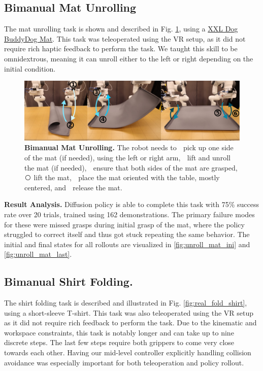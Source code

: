 \subsection{Bimanual Mat Unrolling}

The mat unrolling task is shown and described in Fig. \ref{fig:real_unroll_mat}, using a
\href{https://www.amazon.com/DogBuddy-Dog-Food-Mat-Waterproof/dp/B08GGDNB71}{XXL Dog Buddy\legalTM Dog Mat}.
This task was teleoperated using the VR setup, as it did not require rich haptic feedback to perform the task. We taught this skill to be omnidextrous, meaning it can unroll either to the left or right depending on the initial condition.

\begin{figure}[t]
\centering
\includegraphics[width=\linewidth]{figure/real_unroll_mat_setup_compressed.pdf}
\caption{\textbf{Bimanual Mat Unrolling. }
\label{fig:real_unroll_mat}
The robot needs to
\textcircled{} pick up one side of the mat (if needed), using the left or right arm,
\textcircled{} lift and unroll the mat (if needed),
\textcircled{} ensure that both sides of the mat are grasped,
\textcircled{} lift the mat,
\textcircled{} place the mat oriented with the table, mostly centered, and
\textcircled{} release the mat.
}
\vspace{-4mm}
\end{figure}

\textbf{Result Analysis.} Diffusion policy is able to complete this task with 75\% success rate over 20 trials, trained using 162 demonstrations. The primary failure modes for these were missed grasps during initial grasp of the mat, where the policy struggled to correct itself and thus got stuck repeating the same behavior. The initial and final states for all rollouts are visualized in \ref{fig:unroll_mat_ini} and \ref{fig:unroll_mat_last}.

\subsection{Bimanual Shirt Folding.}
The shirt folding task is described and illustrated in Fig. \ref{fig:real_fold_shirt}, using a short-sleeve T-shirt. This task was also teleoperated using the VR setup as it did not require rich
feedback to perform the task. Due to the kinematic and workspace constraints, this task is notably longer and can take up to nine discrete steps. The last few steps require both grippers to come very close towards each other. Having our mid-level controller explicitly handling collision avoidance was especially important for both teleoperation and policy rollout.

